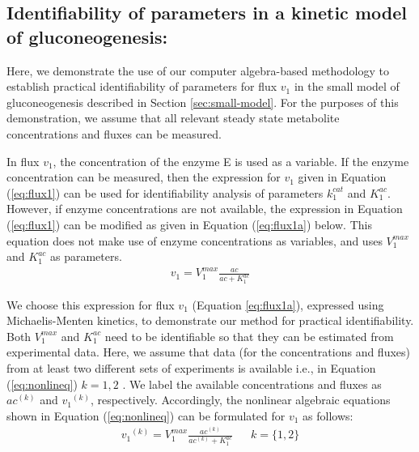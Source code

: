 \documentclass[10pt]{article}
\begin{document}
\subsection{Identifiability of parameters in a kinetic model of gluconeogenesis:}\label{sec:example}
Here, we demonstrate the use of our computer algebra-based methodology to establish practical identifiability of parameters for flux $v_1$ in the small model of gluconeogenesis described in Section \ref{sec:small-model}. For the purposes of this demonstration, we assume that all relevant steady state metabolite concentrations and fluxes can be measured.

In flux $v_1$, the concentration of the enzyme E is used as a variable. If the enzyme concentration can be measured, then the expression for $v_1$ given in Equation (\ref{eq:flux1}) can be used for identifiability analysis of parameters $k_1^{cat}$ and $K_1^{ac}$. However, if enzyme concentrations are not available, the expression in Equation (\ref{eq:flux1}) can be modified as given in Equation (\ref{eq:flux1a}) below. This equation does not make use of enzyme concentrations as variables, and uses $V_1^{max}$ and $K_1^{ac}$ as parameters.
\begin{align}\label{eq:flux1a}
v_1 = V_1^{max}\frac{ac}{ac+K_{1}^{ac}}
\end{align}

We choose this expression for flux $v_1$ (Equation \ref{eq:flux1a}), expressed using Michaelis-Menten kinetics, to demonstrate our method for practical identifiability. Both $V_1^{max}$ and $K_1^{ac}$ need to be identifiable so that they can be estimated from experimental data. Here, we assume that data (for the concentrations and fluxes) from at least two different sets of experiments is available i.e., in Equation (\ref{eq:nonlineq}) $k = {1, 2}$ . We label the available concentrations and fluxes as ${ac}^{(k)}$ and ${v_1}^{(k)}$, respectively.  Accordingly, the nonlinear algebraic equations shown in Equation (\ref{eq:nonlineq}) can be formulated for $v_1$ as follows:
\begin{align}\label{eq:nonlin-flux2}
{v_1}^{(k)} = V_{1}^{max}\frac{ac^{(k)}}{ac^{(k)}+K_{1}^{ac}} &&  k=\{1, 2\}
\end{align}
\end{document}
